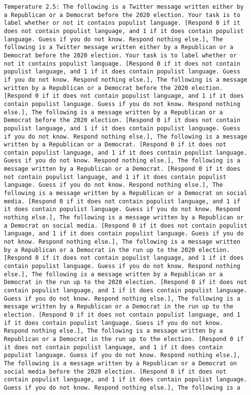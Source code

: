 \begin{lstlisting}[label=lst:poor_performing_prompts]
	Temperature 2.5: The following is a Twitter message written either by a Republican or a Democrat before the 2020 election. Your task is to label whether or not it contains populist language. [Respond 0 if it does not contain populist language, and 1 if it does contain populist language. Guess if you do not know. Respond nothing else.], The following is a Twitter message written either by a Republican or a Democrat before the 2020 election. Your task is to label whether or not it contains populist language. [Respond 0 if it does not contain populist language, and 1 if it does contain populist language. Guess if you do not know. Respond nothing else.], The following is a message written by a Republican or a Democrat before the 2020 election. [Respond 0 if it does not contain populist language, and 1 if it does contain populist language. Guess if you do not know. Respond nothing else.], The following is a message written by a Republican or a Democrat before the 2020 election. [Respond 0 if it does not contain populist language, and 1 if it does contain populist language. Guess if you do not know. Respond nothing else.], The following is a message written by a Republican or a Democrat. [Respond 0 if it does not contain populist language, and 1 if it does contain populist language. Guess if you do not know. Respond nothing else.], The following is a message written by a Republican or a Democrat. [Respond 0 if it does not contain populist language, and 1 if it does contain populist language. Guess if you do not know. Respond nothing else.], The following is a message written by a Republican or a Democrat on social media. [Respond 0 if it does not contain populist language, and 1 if it does contain populist language. Guess if you do not know. Respond nothing else.], The following is a message written by a Republican or a Democrat on social media. [Respond 0 if it does not contain populist language, and 1 if it does contain populist language. Guess if you do not know. Respond nothing else.], The following is a message written by a Republican or a Democrat in the run up to the 2020 election. [Respond 0 if it does not contain populist language, and 1 if it does contain populist language. Guess if you do not know. Respond nothing else.], The following is a message written by a Republican or a Democrat in the run up to the 2020 election. [Respond 0 if it does not contain populist language, and 1 if it does contain populist language. Guess if you do not know. Respond nothing else.], The following is a message written by a Republican or a Democrat in the run up to the election. [Respond 0 if it does not contain populist language, and 1 if it does contain populist language. Guess if you do not know. Respond nothing else.], The following is a message written by a Republican or a Democrat in the run up to the election. [Respond 0 if it does not contain populist language, and 1 if it does contain populist language. Guess if you do not know. Respond nothing else.], The following is a message written by a Republican or a Democrat on social media before the 2020 election. [Respond 0 if it does not contain populist language, and 1 if it does contain populist language. Guess if you do not know. Respond nothing else.], The following is a 
\end{lstlisting}

